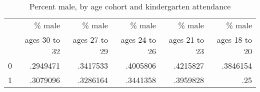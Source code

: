 \begin{table}[!h]
\caption{Percent male, by age cohort and kindergarten attendance}
\centering
\begin{tabular}{llllll}
\cline{1-6}
\multicolumn{1}{c}{} &
  \multicolumn{1}{|r}{\% male} &
  \multicolumn{1}{r}{\% male} &
  \multicolumn{1}{r}{\% male} &
  \multicolumn{1}{r}{\% male} &
  \multicolumn{1}{r}{\% male} \\
\multicolumn{1}{c}{} &
  \multicolumn{1}{|r}{ages 30 to 32} &
  \multicolumn{1}{r}{ages 27 to 29} &
  \multicolumn{1}{r}{ages 24 to 26} &
  \multicolumn{1}{r}{ages 21 to 23} &
  \multicolumn{1}{r}{ages 18 to 20} \\
\cline{1-6}
\multicolumn{1}{l}{0} &
  \multicolumn{1}{|r}{.2949471} &
  \multicolumn{1}{r}{.3417533} &
  \multicolumn{1}{r}{.4005806} &
  \multicolumn{1}{r}{.4215827} &
  \multicolumn{1}{r}{.3846154} \\
\multicolumn{1}{l}{1} &
  \multicolumn{1}{|r}{.3079096} &
  \multicolumn{1}{r}{.3286164} &
  \multicolumn{1}{r}{.3441358} &
  \multicolumn{1}{r}{.3959828} &
  \multicolumn{1}{r}{.25} \\
\cline{1-6}
\end{tabular}
\end{table}
